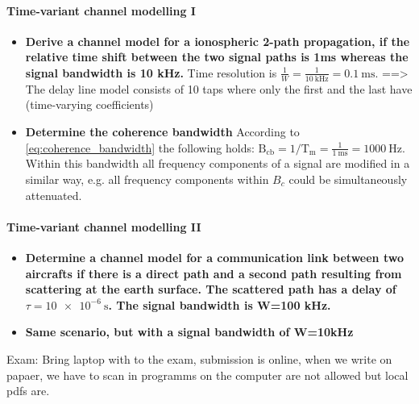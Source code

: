 \paragraph{Time-variant channel modelling I}
\begin{itemize}
    \item \textbf{Derive a channel model for a ionospheric 2-path propagation, if the relative time shift between the two signal paths is 1ms whereas the signal bandwidth is 10 kHz.}\newline
    Time resolution is $\frac{1}{W}=\frac{1}{\SI{10}{\kilo\hertz}}=\SI{0.1}{\milli\second}$. ==> The delay line model consists of 10 taps where only the first and the last have (time-varying coefficients)
    \item \textbf{Determine the coherence bandwidth}\newline
    According to \autoref{eq:coherence_bandwidth} the following holds: $\mathrm{B}_{\mathrm{cb}}=1 / \mathrm{T_m}=\frac{1}{\SI{1}{\milli\second}}=\SI{1000}{\hertz}$. Within this bandwidth all frequency components of a signal are modified in a similar way, e.g. all frequency components within $B_c$ could be simultaneously attenuated.
\end{itemize}

\paragraph{Time-variant channel modelling II}
\begin{itemize}
    \item \textbf{Determine a channel model for a communication link between two aircrafts if there is a direct path and a second path resulting from scattering at the earth surface. The scattered path has a delay of $\tau=\SI{10e-6}{\second}$. The signal bandwidth is W=100 kHz.}
    
    \item \textbf{Same scenario, but with a signal bandwidth of W=10kHz}
\end{itemize}


Exam: Bring laptop with to the exam, submission is online, when we write on papaer, we have to scan in programms on the computer are not allowed but local pdfs are.